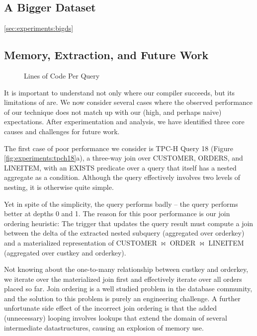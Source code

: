 \subsection{A Bigger Dataset}
\ref{sec:experiments:bigds}


\subsection{Memory, Extraction, and Future Work}
\label{sec:experiments:future}

\begin{figure}
\begin{center}

\caption{Lines of Code Per Query}
\label{fig:experiments:loc}
\end{center}
\end{figure}

It is important to understand not only where our compiler succeeds, but its limitations of are.  We now consider several cases where the observed performance of our technique does not match up with our (high, and perhaps naive) expectations.  After experimentation and analysis, we have identified three core causes and challenges for future work.

The first case of poor performance we consider is TPC-H Query 18 (Figure \ref{fig:experiments:tpch18}a), a three-way join over CUSTOMER, ORDERS, and LINEITEM, with an EXISTS predicate over a query that itself has a nested aggregate as a condition.  Although the query effectively involves two levels of nesting, it is otherwise quite simple.

Yet in spite of the simplicity, the query performs badly -- the query performs better at depths 0 and 1.  The reason for this poor performance is our join ordering heuristic: The trigger that updates the query result must compute a join between the delta of the extracted nested subquery (aggregated over orderkey) and a materialized representation of CUSTOMER $\bowtie$ ORDER $\bowtie$ LINEITEM (aggregated over custkey and orderkey).  

Not knowing about the one-to-many relationship between custkey and orderkey, we iterate over the materialized join first and effectively iterate over all orders placed so far.  Join ordering is a well studied problem in the database community, and the solution to this problem is purely an engineering challenge.  A further unfortunate side effect of the incorrect join ordering is that the added (unnecessary) looping involves lookups that extend the domain of several intermediate datastructures, causing an explosion of memory use.

